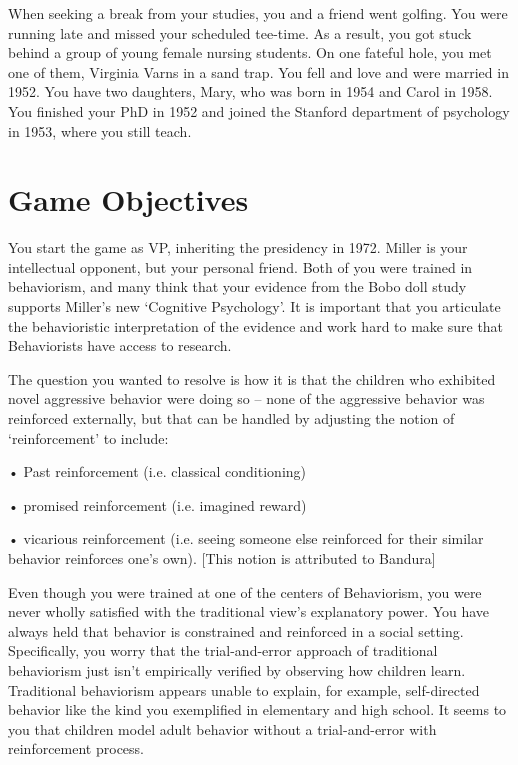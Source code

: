 \begin{refsection}
When seeking a break from your studies, you and a friend went golfing. You were running late and missed your scheduled tee-time. As a result, you got stuck behind a group of young female nursing students. On one fateful hole, you met one of them, Virginia Varns in a sand trap. You fell and love and were married in 1952. You have two daughters, Mary, who was born in 1954 and Carol in 1958.
 
You finished your PhD in 1952 and joined the Stanford department of psychology in 1953, where you still teach.

\section{Game Objectives}
\label{gameobjectives}

You start the game as VP, inheriting the presidency in 1972. Miller is your intellectual opponent, but your personal friend. Both of you were trained in behaviorism, and many think that your evidence from the Bobo doll study supports Miller's new `Cognitive Psychology'. It is important that you articulate the behavioristic interpretation of the evidence and work hard to make sure that Behaviorists have access to research.

The question you wanted to resolve is how it is that the children who exhibited novel aggressive behavior were doing so – none of the aggressive behavior was reinforced externally, but that can be handled by adjusting the notion of `reinforcement' to include:

• Past reinforcement (i.e. classical conditioning)

• promised reinforcement (i.e. imagined reward)

• vicarious reinforcement (i.e. seeing someone else reinforced for their similar behavior reinforces one's own). [This notion is attributed to Bandura]

Even though you were trained at one of the centers of Behaviorism, you were never wholly satisfied with the traditional view's explanatory power. You have always held that behavior is constrained and reinforced in a social setting. Specifically, you worry that the trial-and-error approach of traditional behaviorism just isn't empirically verified by observing how children learn. Traditional behaviorism appears unable to explain, for example, self-directed behavior like the kind you exemplified in elementary and high school. It seems to you that children model adult behavior without a trial-and-error with reinforcement process.


\end{refsection}
